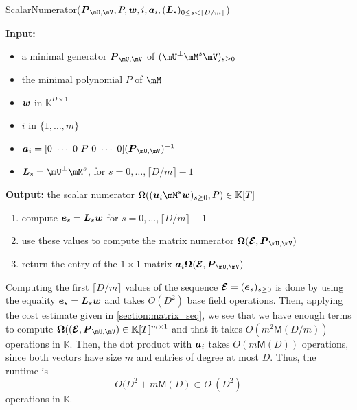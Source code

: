 \documentclass[12pt]{article}
\newcommand{\mat}[1]{\bm{\MakeUppercase{#1}}} %
\newcommand{\row}[1]{\bm{\MakeLowercase{#1}}} %
\newcommand{\col}[1]{\bm{\MakeLowercase{#1}}} %
\newcommand{\softO}[1]{O{\tilde{~}}(#1)} %
\newcommand{\minpoly}{P}
\def\M {\ensuremath{\mathsf{M}}}
\def\K{\mathbb{K}}
\def\K {\ensuremath{\mathbb{K}}}
\begin{document}
\begin{algorithm}[H]
	\caption{ScalarNumerator($\mat{P}_{\mU,\mV}, \minpoly, \row{w}, i, \row{a}_i,(\mat{L}_s)_{0 \le s < \lceil D/m\rceil}$)}
	{\bf Input:} \vspace{-0.5em}
	\begin{itemize}
		\item a minimal generator $\mat{P}_{\mU,\mV}$ of $(\mU^\perp \mM^s \mV)_{s \ge 0}$
                \item the minimal polynomial $P$ of $\mM$
                \item $\row{w}$ in $\K^{D \times 1}$
                \item $i$ in $\{1,\dots,m\}$
                \item $\row{a}_i =  [0~\cdots~0~\minpoly~0~\cdots~0]  (\mat{P}_{\mU,\mV})^{-1} $
		\item $\mat{L}_s = \mU^\perp \mM^s$, for $s=0,\dots,\lceil D/m\rceil-1$
	\end{itemize}
	{\bf Output:} the scalar numerator $\Omega((\row{u}_i \mM^s \col{w})_{s \ge 0}, \minpoly) \in \K[T]$
        \begin{enumerate}[{\bf 1.}]
        \item compute $\col{E}_s = \mat{L}_s \col{w}$ for $s=0,\dots,\lceil D/m\rceil-1$
        \item use these values to compute the matrix numerator $ \mat{\Omega}(\mat{\mathcal{E}}, \mat{P}_{\mU,\mV})$ 
        \item return the entry of the $1 \times 1$ matrix $\row{a}_i  \mat{\Omega}(\mat{\mathcal{E}}, \mat{P}_{\mU,\mV})$ 
        \end{enumerate}
	\label{algo:block-sparse-fglm}
\end{algorithm}

Computing the first $\lceil D/m \rceil$ values of the sequence
$\mat{\mathcal{E}}=(\col{e}_s)_{s \ge 0}$ is done by using the
equality $\col{E}_s = \mat{L}_s \col{w}$ and takes $O(D^2)$ base field
operations. Then, applying the cost estimate given in
\cref{section:matrix_seq}, we see that we have enough terms to compute
$\mat{\Omega}( (\mat{\mathcal{E}}, \mat{P}_{\mU,\mV}) \in \K[T]^{m
  \times 1}$ and that it takes $O(m^2 \M(D/m))$ operations in
$\K$. Then, the dot product with $\row{a}_i$ takes $O(m \M(D))$
operations, since both vectors have size $m$ and entries of degree at
most $D$. Thus, the runtime is 
$$O(D^2 + m \M(D) \subset \softO{D^2}$$
operations in $\K$.


\end{document}
